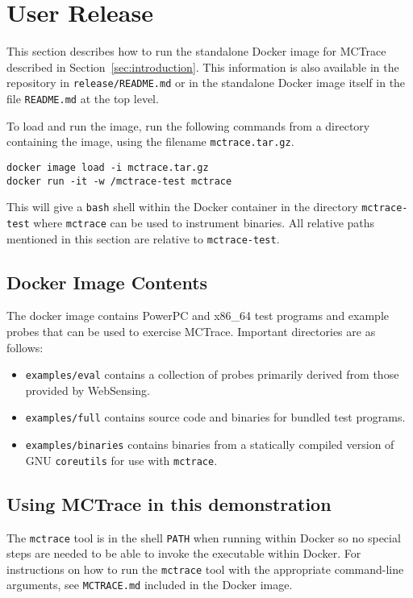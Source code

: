 \section{User Release}
\label{sec:user-release}

This section describes how to run the standalone Docker image for
MCTrace described in Section~\ref{sec:introduction}. This information is
also available in the repository in \texttt{release/README.md} or in the
standalone Docker image itself in the file \texttt{README.md} at the top
level.

To load and run the image, run the following commands from a directory
containing the image, using the filename \texttt{mctrace.tar.gz}.

\begin{verbatim}
docker image load -i mctrace.tar.gz
docker run -it -w /mctrace-test mctrace
\end{verbatim}

This will give a \texttt{bash} shell within the Docker container in the
directory \texttt{mctrace-test} where \texttt{mctrace} can be used to
instrument binaries. All relative paths mentioned in this section are
relative to \texttt{mctrace-test}.

\subsection{Docker Image Contents}

The docker image contains PowerPC and x86\_64 test programs and example
probes that can be used to exercise MCTrace. Important directories are
as follows:
\begin{itemize}
\item \texttt{examples/eval} contains a collection of probes primarily derived
   from those provided by WebSensing.
\item \texttt{examples/full} contains source code and binaries for bundled test
   programs.
\item \texttt{examples/binaries} contains binaries from a statically compiled
   version of GNU \texttt{coreutils} for use with \texttt{mctrace}.
 \end{itemize}
 
\subsection{Using MCTrace in this demonstration}

The \texttt{mctrace} tool is in the shell \texttt{PATH} when running within Docker
so no special steps are needed to be able to invoke the executable within Docker.
For instructions on how to run the \texttt{mctrace} tool with the appropriate
command-line arguments, see \texttt{MCTRACE.md} included in the Docker image.

